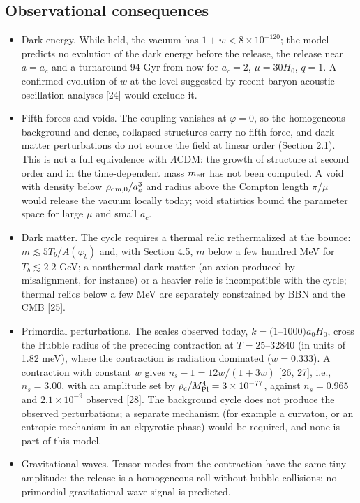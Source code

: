 \documentclass[11pt,a4paper]{article}
\begin{document}
\subsection{Observational consequences}
\begin{itemize}\item Dark energy. While held, the vacuum has $1+w<8\times10^{-120}$; the model predicts no evolution of the dark energy before the release, the release near $a=a_c$ and a turnaround 94 Gyr from now for $a_c=2$, $\mu=30H_0$, $q=1$. A confirmed evolution of $w$ at the level suggested by recent baryon-acoustic-oscillation analyses [24] would exclude it.
\item Fifth forces and voids. The coupling vanishes at $\varphi=0$, so the homogeneous background and dense, collapsed structures carry no fifth force, and dark-matter perturbations do not source the field at linear order (Section 2.1). This is not a full equivalence with $\Lambda$CDM: the growth of structure at second order and in the time-dependent mass $m_{\rm eff}$ has not been computed. A void with density below $\rho_{\rm dm,0}/a_c^3$ and radius above the Compton length $\pi/\mu$ would release the vacuum locally today; void statistics bound the parameter space for large $\mu$ and small $a_c$.
\item Dark matter. The cycle requires a thermal relic rethermalized at the bounce: $m\lesssim5T_b/A(\varphi_b)$ and, with Section 4.5, $m$ below a few hundred MeV for $T_b\lesssim2.2$ GeV; a nonthermal dark matter (an axion produced by misalignment, for instance) or a heavier relic is incompatible with the cycle; thermal relics below a few MeV are separately constrained by BBN and the CMB [25].
\item Primordial perturbations. The scales observed today, $k=(1$--$1000)a_0H_0$, cross the Hubble radius of the preceding contraction at $T=25$--$32840$ (in units of 1.82 meV), where the contraction is radiation dominated ($w=0.333$). A contraction with constant $w$ gives $n_s-1=12w/(1+3w)$ [26, 27], i.e., $n_s=3.00$, with an amplitude set by $\rho_c/M_{\rm Pl}^4=3\times10^{-77}$, against $n_s=0.965$ and $2.1\times10^{-9}$ observed [28]. The background cycle does not produce the observed perturbations; a separate mechanism (for example a curvaton, or an entropic mechanism in an ekpyrotic phase) would be required, and none is part of this model.
\item Gravitational waves. Tensor modes from the contraction have the same tiny amplitude; the release is a homogeneous roll without bubble collisions; no primordial gravitational-wave signal is predicted.
\end{itemize}
\end{document}
